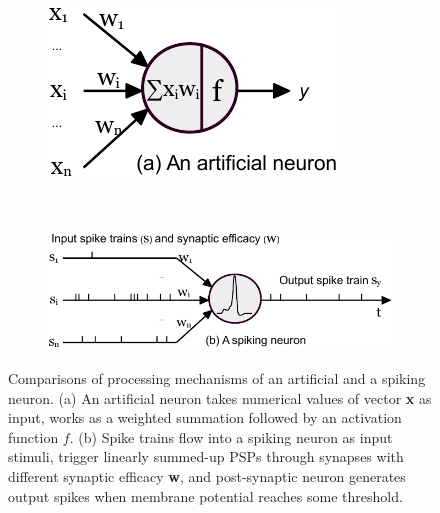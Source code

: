 \documentclass{article}
\begin{document}
\begin{figure}[tb!]
	\centering
	\begin{subfigure}[t]{0.28\textwidth}
		\includegraphics[width=\textwidth]{pics_iconip/neuron_ann.pdf}
	\end{subfigure}~
	\begin{subfigure}[t]{0.65\textwidth}
		\includegraphics[width=\textwidth]{pics_iconip/neuron_snn.pdf}
	\end{subfigure}
	\caption{Comparisons of processing mechanisms of an artificial and a spiking neuron. (a) An artificial neuron takes numerical values of vector \textbf{x} as input, works as a weighted summation followed by an activation function $f$. (b) Spike trains flow into a spiking neuron as input stimuli, trigger linearly summed-up PSPs through synapses with different synaptic efficacy \textbf{w}, and post-synaptic neuron generates output spikes when membrane potential reaches some threshold.}
	\label{Fig:compare_as}
\end{figure}
\end{document}
